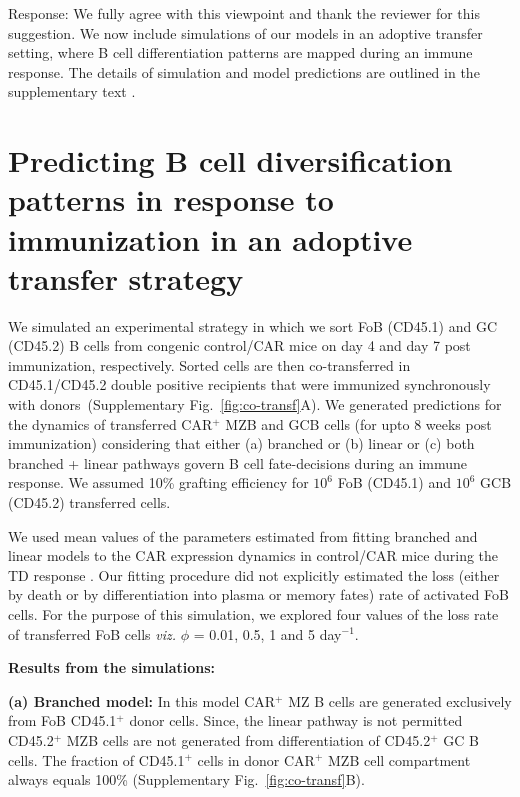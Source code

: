 \documentclass[11pt]{article}
\newcommand{\red}[1]{{\color{red}{#1}}}
\begin{document}
Response: We fully agree with this viewpoint and thank the reviewer for this suggestion. 
We now include simulations of our models in an adoptive transfer setting, where B cell differentiation patterns are mapped during an immune response.
The details of simulation and model predictions are outlined  in the supplementary text \red{XX}.



\clearpage


\section*{Predicting B cell diversification patterns in response to immunization in an adoptive transfer strategy}

We simulated an experimental strategy in which we sort FoB (CD45.1) and GC (CD45.2) B cells from congenic control/CAR mice on day 4 and day 7 post immunization, respectively.
Sorted cells are then co-transferred in CD45.1/CD45.2 double positive recipients that were immunized synchronously with donors~(Supplementary Fig.~\ref{fig:co-transf}A). 
We generated predictions for the dynamics of transferred CAR$^{+}$ MZB and GCB cells (for upto 8 weeks post immunization) considering that either (a) branched or (b) linear or (c) both branched + linear pathways govern B cell fate-decisions during an immune response.
We assumed 10\% grafting efficiency for $10^{6}$ FoB (CD45.1) and $10^{6}$ GCB (CD45.2) transferred cells. 

We used mean values of the parameters estimated from fitting branched and linear models to the CAR expression dynamics in control/CAR mice during the TD response .
Our fitting procedure did not explicitly estimated the loss (either by death or by differentiation into plasma or memory fates) rate of activated FoB cells.
For the purpose of this simulation, we explored four values of the loss rate of transferred FoB cells \textit{viz.} $\phi$ = 0.01, 0.5, 1 and 5 day$^{-1}$.

\textbf{Results from the simulations:}

\textbf{(a) Branched model:}
In this model CAR$^{+}$  MZ B cells are generated exclusively from FoB CD45.1$^{+}$ donor cells.
Since, the linear pathway is not permitted CD45.2$^{+}$ MZB cells are not generated from differentiation of CD45.2$^{+}$ GC B cells.  
The fraction of CD45.1$^{+}$ cells in donor CAR$^{+}$ MZB cell compartment always equals 100\% (Supplementary Fig.~\ref{fig:co-transf}B).
\end{document}
